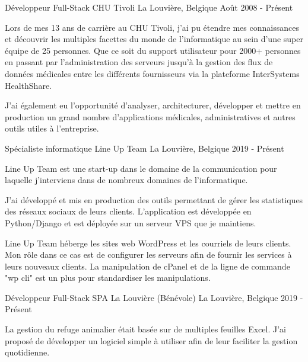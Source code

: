 

\begin{cventries}

  \cventry
    {Développeur Full-Stack} %
    {CHU Tivoli} %
    {La Louvière, Belgique} %
    {Août 2008 - Présent} %
    {
    Lors de mes 13 ans de carrière au CHU Tivoli, j'ai pu étendre mes connaissances et découvrir les multiples facettes du monde de l'informatique au sein d'une super équipe de 25 personnes.
    Que ce soit du support utilisateur pour 2000+ personnes en passant par l'administration des serveurs jusqu'à la gestion des flux de données médicales entre les différents fournisseurs via la plateforme InterSystems HealthShare.
    
    J'ai également eu l'opportunité d'analyser, architecturer, développer et mettre en production un grand nombre d'applications médicales, administratives et autres outils utiles à l'entreprise.
    
    }

  \cventry
    {Spécialiste informatique} %
    {Line Up Team} %
    {La Louvière, Belgique} %
    {2019 - Présent} %
    {
    Line Up Team est une start-up dans le domaine de la communication pour laquelle j'interviens dans de nombreux domaines de l'informatique.
    
    J'ai développé et mis en production des outils permettant de gérer les statistiques des réseaux sociaux de leurs clients. L'application est développée en Python/Django et est déployée sur un serveur VPS que je maintiens.
    
    Line Up Team héberge les sites web WordPress et les courriels de leurs clients. Mon rôle dans ce cas est de configurer les serveurs afin de fournir les services à leurs nouveaux clients. La manipulation de cPanel et de la ligne de commande "wp cli" est un plus pour standardiser les manipulations.

    }
    
    
  \cventry
    {Développeur Full-Stack} %
    {SPA La Louvière (Bénévole)} %
    {La Louvière, Belgique} %
    {2019 - Présent} %
    {
    La gestion du refuge animalier était basée sur de multiples feuilles Excel. J'ai proposé de développer un logiciel simple à utiliser afin de leur faciliter la gestion quotidienne.

}
\end{cventries}
